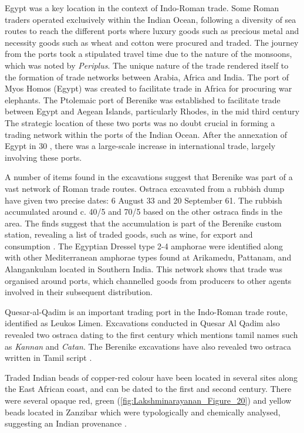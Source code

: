 
Egypt was a key location in the context of Indo-Roman trade. Some Roman traders operated exclusively within the Indian Ocean, following a diversity of sea routes to reach the different ports where luxury goods such as precious metal and necessity goods such as wheat and cotton were procured and traded. The journey from the ports took a stipulated travel time due to the nature of the monsoons, which was noted by \emph{Periplus}. The unique nature of the trade rendered itself to the formation of trade networks between Arabia, Africa and India. The port of Myos Homos (Egypt) was created to facilitate trade in Africa for procuring war elephants. The Ptolemaic port of Berenike was established to facilitate trade between Egypt and Aegean Islands, particularly Rhodes, in the mid third century \BC \parencite[][203]{tomber2012} The strategic location of these two ports was no doubt crucial in forming a trading network within the ports of the Indian Ocean. After the annexation of Egypt in 30 \BC, there was a large-scale increase in international trade, largely involving these ports.

A number of items found in the excavations suggest that Berenike was part of a vast network of Roman trade routes. Ostraca excavated from a rubbish dump have given two precise dates: 6 August 33 and 20 September 61. The rubbish accumulated around c. 40/5 and 70/5 based on the other ostraca finds in the area. The finds suggest that the accumulation is part of the Berenike custom station, revealing a list of traded goods, such as wine, for export and consumption \parencite[][7]{bagnall2000}. The Egyptian Dressel type 2-4 amphorae were identified along with other Mediterranean amphorae types found at Arikamedu, Pattanam, and Alangankulam located in Southern India. This network shows that trade was organised around ports, which channelled goods from producers to other agents involved in their subsequent distribution.

Quesar-al-Qadim is an important trading port in the Indo-Roman trade route, identified as Leukos Limen. Excavations conducted in Quesar Al Qadim also revealed two ostraca dating to the first century which mentions tamil names such as \emph{Kannan} and \emph{Catan}. The Berenike excavations have also revealed two ostraca written in Tamil script \parencite[][264]{whitcomb1982}.

Traded Indian beads of copper-red colour have been located in several sites along the East African coast, and can be dated to the first and second century\AD. There were several opaque red, green (\cref{fig:Lakshminarayanan_Figure_20}) and yellow beads located in Zanzibar which were typologically and chemically analysed, suggesting an Indian provenance \parencite[][33-44]{chami2001}.

